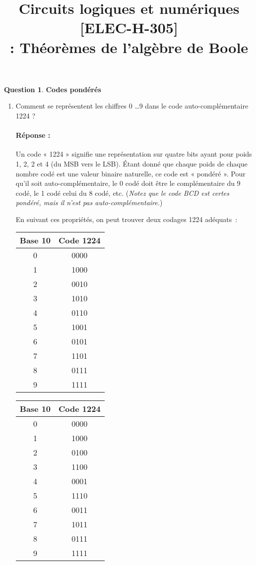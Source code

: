 \documentclass[11pt,a4paper]{article}
\date{}
\title{\vspace{-2cm}Circuits logiques et numériques [ELEC-H-305] \\  \tpnumber : Théorèmes de l'algèbre de Boole \ifthenelse{\boolean{corrige}}{-- Corrigé}{} \\ \small{\version}}
\theoremstyle{definition}%
\newtheorem{Q}{Question}[] %
\newcommand{\reponse}[1]{%
	\ifthenelse {\boolean{corrige}} {\paragraph{Réponse :} \color{darkblue}   #1\color{black}} {}
 }
\begin{document}
\maketitle
\vspace*{-1cm}





\begin{Q}
\textbf{Codes pondérés}
\begin{enumerate}
	\item Comment se représentent les chiffres 0 \dots 9 dans le code auto-complémentaire 1224 ?
	\reponse{
	Un code « 1224 » signifie une représentation sur quatre bits ayant pour poids 1, 2, 2 et 4 (du MSB vers le LSB).
	Étant donné que chaque poids de chaque nombre codé est une valeur binaire naturelle, ce code est « pondéré ».
	Pour qu'il soit auto-complémentaire, le 0 codé doit être le complémentaire du 9 codé, le 1 codé celui du 8 codé, etc. (\textit{Notez que le code BCD est certes pondéré, mais il n'est pas auto-complémentaire.})

	En suivant ces propriétés, on peut trouver deux codages 1224 adéquats~:
		\begin{center}
			\begin{tabular}{c|c}
			Base 10 & Code 1224 \\ \hline
			0 & 0000 \\
			1 & 1000 \\
			2 & 0010 \\
			3 & 1010 \\
			4 & 0110 \\
			5 & 1001 \\
			6 & 0101 \\
			7 & 1101 \\
			8 & 0111 \\
			9 & 1111 \\
			\end{tabular}
			\begin{tabular}{c|c}
			Base 10 & Code 1224 \\ \hline
			0 & 0000 \\
			1 & 1000 \\
			2 & 0100 \\
			3 & 1100 \\
			4 & 0001 \\
			5 & 1110 \\
			6 & 0011 \\
			7 & 1011 \\
			8 & 0111 \\
			9 & 1111 \\
			\end{tabular}
		\end{center}

}
\end{enumerate}
\end{Q}
\end{document}
